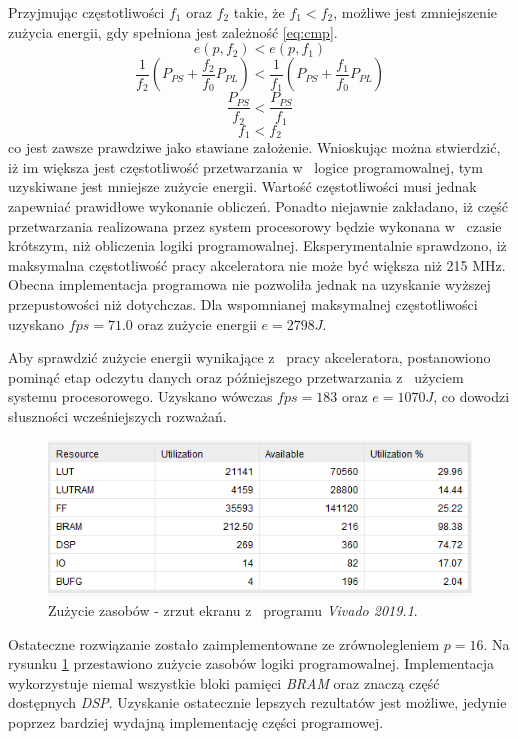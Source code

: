 Przyjmując częstotliwości $f_1$ oraz $f_2$ takie, że $f_1 < f_2$, możliwe jest zmniejszenie zużycia energii, gdy spełniona jest zależność \eqref{eq:cmp}.
\begin{equation}
e(p, f_2) < e(p,f_1)
\label{eq:cmp}
\end{equation}
\begin{equation}
\frac{1}{f_2}(P_{PS} + \frac{f_2}{f_0} P_{PL}) < 
\frac{1}{f_1}(P_{PS} + \frac{f_1}{f_0} P_{PL})
\end{equation}
\begin{equation}
\frac{P_{PS}}{f_2} < 
\frac{P_{PS}}{f_1}
\end{equation}
\begin{equation}
f_1 < f_2
\end{equation}
co jest zawsze prawdziwe jako stawiane założenie.
Wnioskując można stwierdzić, iż im większa jest częstotliwość przetwarzania w~ logice programowalnej, tym uzyskiwane jest mniejsze zużycie energii.
Wartość częstotliwości musi jednak zapewniać prawidłowe wykonanie obliczeń.
Ponadto niejawnie zakładano, iż część przetwarzania realizowana przez system procesorowy będzie wykonana w~ czasie krótszym, niż obliczenia logiki programowalnej.
Eksperymentalnie sprawdzono, iż maksymalna częstotliwość pracy akceleratora nie może być większa niż 215 MHz.
Obecna implementacja programowa nie pozwoliła jednak na uzyskanie wyższej przepustowości niż dotychczas.
Dla wspomnianej maksymalnej częstotliwości uzyskano $fps = 71.0$ oraz zużycie energii $e = 2798 J$.

Aby sprawdzić zużycie energii wynikające z~ pracy akceleratora, postanowiono pominąć etap odczytu danych oraz późniejszego przetwarzania z~ użyciem systemu procesorowego.
Uzyskano wówczas $fps = 183 $ oraz $e = 1070 J$, co dowodzi słuszności wcześniejszych rozważań.
 
 
\begin{figure}
    \centering
    \includegraphics[width=0.9\linewidth]{images/zasoby.png}
    \caption{Zużycie zasobów - zrzut ekranu z~ programu \emph{Vivado 2019.1}.}
    \label{fig:resources}
\end{figure}

Ostateczne rozwiązanie zostało zaimplementowane ze zrównolegleniem $p = 16$.
Na rysunku \ref{fig:resources} przestawiono zużycie zasobów logiki programowalnej.
Implementacja wykorzystuje niemal wszystkie bloki pamięci \emph{BRAM} oraz znaczą część dostępnych \emph{DSP}.
Uzyskanie ostatecznie lepszych rezultatów jest możliwe, jedynie poprzez bardziej wydajną implementację części programowej.



